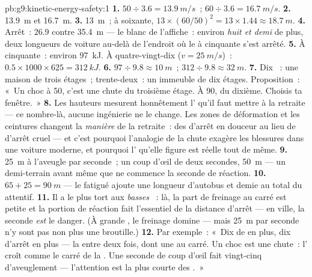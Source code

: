 \begin{solution}{pb:g9:kinetic-energy-safety:1}
\textbf{1.} $50 \div 3.6 = \qty{13.9}{m/s}$~;
$60 \div 3.6 = \qty{16.7}{m/s}$.
\textbf{2.} \qty{13.9}{m} et \qty{16.7}{m}.
\textbf{3.} \qty{13}{m}~; à soixante,
$13 \times (60/50)^2 = 13 \times 1.44 \approx \qty{18.7}{m}$.
\textbf{4.} Arrêt~: $26.9$ contre \qty{35.4}{m} --- le blanc de
l'affiche~: environ \emph{huit  et demi} de plus, deux longueurs
de voiture au-delà de l'endroit où le  à cinquante s'est
arrêté.
\textbf{5.} À cinquante~: environ \qty{97}{kJ}. À quatre-vingt-dix
($v = \qty{25}{m/s}$)~:
$0.5 \times 1000 \times 625 = \qty{312}{kJ}$.
\textbf{6.} $97 \div 9.8 \approx \qty{10}{m}$~;
$312 \div 9.8 \approx \qty{32}{m}$.
\textbf{7.} Dix ~: une maison de trois étages~; trente-deux~: un
immeuble de dix étages. Proposition~: «~Un choc à 50, c'est une chute
du troisième étage. À 90, du dixième. Choisis ta fenêtre.~»
\textbf{8.} Les hauteurs mesurent honnêtement l' qu'il faut
mettre à la retraite --- ce nombre-là, aucune ingénierie ne le change.
Les zones de déformation et les ceintures changent la \emph{manière}
de la retraite~: des  d'arrêt en douceur au lieu de 
d'arrêt cruel --- et c'est pourquoi l'analogie de la chute exagère les
blessures dans une voiture moderne, et pourquoi l' qu'elle
figure est réelle tout de même.
\textbf{9.} \qty{25}{m} à l'aveugle par seconde~; un coup d'œil de
deux secondes, \qty{50}{m} --- un demi-terrain avant même que ne
commence la seconde de réaction.
\textbf{10.} $65 + 25 = \qty{90}{m}$ --- le  fatigué ajoute
une longueur d'autobus et demie au total du  attentif.
\textbf{11.} Il a le plus tort aux \emph{basses} ~: là, la
part de freinage au carré est petite et la portion de réaction fait
l'essentiel de la distance d'arrêt --- en ville, la seconde
\emph{est} le danger. (À grande , le freinage domine --- mais
\qty{25}{m} par seconde n'y sont pas non plus une broutille.)
\textbf{12.} Par exemple~: «~Dix de  en plus, dix 
d'arrêt en plus --- la  entre deux fois, dont une au carré. Un
choc est une chute~: l' croît comme le carré de la . Une
seconde de coup d'œil fait vingt-cinq  d'aveuglement ---
l'attention est la plus courte des .~»
\end{solution}
